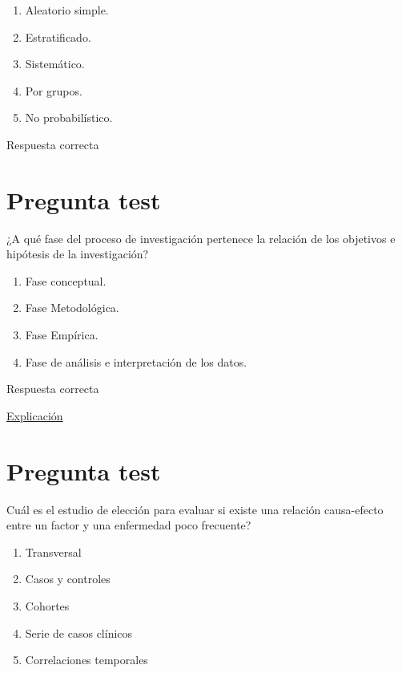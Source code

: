 \documentclass[
]{book}
\providecommand{\tightlist}{%
  \setlength{\itemsep}{0pt}\setlength{\parskip}{0pt}}
\begin{document}
\begin{enumerate}
\def\labelenumi{\alph{enumi})}
\tightlist
\item
  Aleatorio simple.
\item
  Estratificado.
\item
  Sistemático.
\item
  Por grupos.
\item
  No probabilístico.
\end{enumerate}

Respuesta correcta

\hypertarget{pregunta-test-43}{%
\section{Pregunta test}\label{pregunta-test-43}}

¿A qué fase del proceso de investigación pertenece la relación de los objetivos e hipótesis de la investigación?

\begin{enumerate}
\def\labelenumi{\alph{enumi})}
\tightlist
\item
  Fase conceptual.
\item
  Fase Metodológica.
\item
  Fase Empírica.
\item
  Fase de análisis e interpretación de los datos.
\end{enumerate}

Respuesta correcta

\href{https://www.salusplay.com/apuntes/apuntes-metodologia-de-la-investigacion/tema-4-el-proceso-de-investigacion-fases-de-realizacion-de-una-investigacion-cientifica/2}{Explicación}

\hypertarget{pregunta-test-44}{%
\section{Pregunta test}\label{pregunta-test-44}}

Cuál es el estudio de elección para evaluar si existe una relación causa-efecto entre un factor y una enfermedad poco frecuente?

\begin{enumerate}
\def\labelenumi{\alph{enumi})}
\tightlist
\item
  Transversal
\item
  Casos y controles
\item
  Cohortes
\item
  Serie de casos clínicos
\item
  Correlaciones temporales
\end{enumerate}
\end{document}
